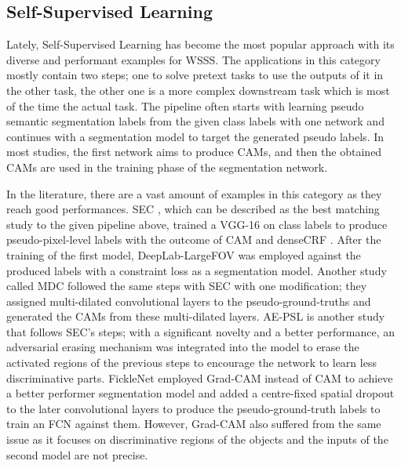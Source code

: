 \documentclass[sn-mathphys]{sn-jnl}
\theoremstyle{thmstyleone}
\theoremstyle{thmstyletwo}\newtheorem{example}{Example}\newtheorem{remark}{Remark}
\theoremstyle{thmstylethree}\newtheorem{definition}{Definition}
\begin{document}
\subsection{Self-Supervised Learning}
\label{self_supervised_learning}

Lately, Self-Supervised Learning has become the most popular approach with its diverse and performant examples for WSSS. The applications in this category mostly contain two steps; one to solve pretext tasks to use the outputs of it in the other task, the other one is a more complex downstream task which is most of the time the actual task. The pipeline often starts with learning pseudo semantic segmentation labels from the given class labels with one network and continues with a segmentation model to target the generated pseudo labels. In most studies, the first network aims to produce CAMs, and then the obtained CAMs are used in the training phase of the segmentation network.

In the literature, there are a vast amount of examples in this category as they reach good performances. SEC \cite{DBLP:journals/corr/KolesnikovL16}, which can be described as the best matching study to the given pipeline above, trained a VGG-16 on class labels to produce pseudo-pixel-level labels with the outcome of CAM and denseCRF \cite{DBLP:journals/corr/abs-1210-5644}. After the training of the first model, DeepLab-LargeFOV \cite{chen2016semantic} was employed against the produced labels with a constraint loss as a segmentation model. Another study called MDC \cite{DBLP:journals/corr/abs-1805-04574} followed the same steps with SEC with one modification; they assigned multi-dilated convolutional layers to the pseudo-ground-truths and generated the CAMs from these multi-dilated layers. AE-PSL \cite{DBLP:journals/corr/WeiFLCZY17} is another study that follows SEC’s steps; with a significant novelty and a better performance, an adversarial erasing mechanism was integrated into the model to erase the activated regions of the previous steps to encourage the network to learn less discriminative parts. FickleNet \cite{DBLP:journals/corr/abs-1902-10421} employed Grad-CAM instead of CAM to achieve a better performer segmentation model and added a centre-fixed spatial dropout to the later convolutional layers to produce the pseudo-ground-truth labels to train an FCN against them. However, Grad-CAM also suffered from the same issue as it focuses on discriminative regions of the objects and the inputs of the second model are not precise. 
\end{document}
